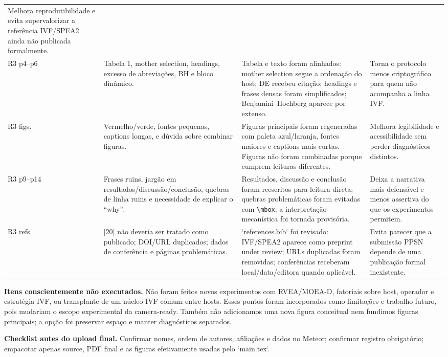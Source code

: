 \documentclass[10pt]{article}
\begin{document}
\begin{longtable}{@{}L{1.35cm}L{4.25cm}L{6.35cm}L{4.25cm}@{}}
Melhora reprodutibilidade e evita supervalorizar a refer\^encia IVF/SPEA2 ainda n\~ao publicada formalmente. \\
\addlinespace
R3 p4--p6 &
Tabela 1, mother selection, headings, excesso de abrevia\c{c}\~oes, BH e bloco din\^amico. &
Tabela e texto foram alinhados: mother selection segue a ordena\c{c}\~ao do host; DE recebeu cita\c{c}\~ao; headings e frases densas foram simplificados; Benjamini--Hochberg aparece por extenso. &
Torna o protocolo menos criptogr\'afico para quem n\~ao acompanha a linha IVF. \\
\addlinespace
R3 figs. &
Vermelho/verde, fontes pequenas, captions longas, e d\'uvida sobre combinar figuras. &
Figuras principais foram regeneradas com paleta azul/laranja, fontes maiores e captions mais curtas. Figuras n\~ao foram combinadas porque cumprem leituras diferentes. &
Melhora legibilidade e acessibilidade sem perder diagn\'osticos distintos. \\
\addlinespace
R3 p9--p14 &
Frases ruins, jarg\~ao em resultados/discuss\~ao/conclus\~ao, quebras de linha ruins e necessidade de explicar o ``why''. &
Resultados, discuss\~ao e conclus\~ao foram reescritos para leitura direta; quebras problem\'aticas foram evitadas com \texttt{\textbackslash mbox}; a interpreta\c{c}\~ao mecan\'istica foi tornada provis\'oria. &
Deixa a narrativa mais defens\'avel e menos assertiva do que os experimentos permitem. \\
\addlinespace
R3 refs. &
[20] n\~ao deveria ser tratado como publicado; DOI/URL duplicados; dados de confer\^encia e p\'aginas problem\'aticas. &
`references.bib` foi revisado: IVF/SPEA2 aparece como preprint under review; URLs duplicadas foram removidas; confer\^encias receberam local/data/editora quando aplic\'avel. &
Evita parecer que a submiss\~ao PPSN depende de uma publica\c{c}\~ao formal inexistente. \\
\bottomrule
\end{longtable}
\normalsize

\textbf{Itens conscientemente n\~ao executados.} N\~ao foram feitos novos
experimentos com RVEA/MOEA-D, fatoriais sobre host, operador e estrat\'egia IVF,
ou transplante de um n\'ucleo IVF comum entre hosts. Esses pontos foram incorporados como
limita\c{c}\~oes e trabalho futuro, pois mudariam o escopo experimental da
camera-ready. Tamb\'em n\~ao adicionamos uma nova figura conceitual nem fundimos
figuras principais; a op\c{c}\~ao foi preservar espa\c{c}o e manter diagn\'osticos
separados.

\textbf{Checklist antes do upload final.} Confirmar nomes, ordem de autores,
afilia\c{c}\~oes e dados no Meteor; confirmar registro obrigat\'orio; empacotar
apenas source, PDF final e as figuras efetivamente usadas pelo `main.tex`.
\end{document}

